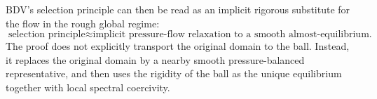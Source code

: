 \documentclass[11pt]{article}
\begin{document}
BDV's selection principle can then be read as an implicit rigorous substitute for the flow in the rough global regime:
\[
\boxed{
    \text{selection principle}
    \approx
    \text{implicit pressure-flow relaxation to a smooth almost-equilibrium.}
}
\]
The proof does not explicitly transport the original domain to the ball. Instead, it replaces the original domain by a nearby smooth pressure-balanced representative, and then uses the rigidity of the ball as the unique equilibrium together with local spectral coercivity.
\end{document}
